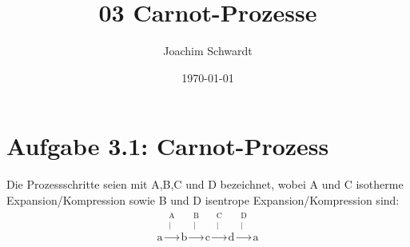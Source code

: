 \documentclass[a4paper,12pt]{article}
\newcommand{\kom}{}
\newcommand{\tecxt}{}
\begin{document}
\title{03 Carnot-Prozesse}
\author{Joachim Schwardt}
\date{\today}
\maketitle

\section*{Aufgabe 3.1: Carnot-Prozess}
Die Prozessschritte seien mit A,B,C und D bezeichnet, wobei A und C isotherme Expansion/Kompression sowie B und D isentrope Expansion/Kompression sind:
\begin{align*}
\tecxt\text{a}\kom\overset{\substack{{\tecxt\text{A}} \\ |}}{\longrightarrow}\tecxt\text{b}\kom\overset{\substack{{\tecxt\text{B}} \\ |}}{\longrightarrow}\tecxt\text{c}\kom\overset{\substack{{\tecxt\text{C}} \\ |}}{\longrightarrow}\tecxt\text{d}\kom\overset{\substack{{\tecxt\text{D}} \\ |}}{\longrightarrow}\tecxt\text{a}
\end{align*} 
\end{document}
